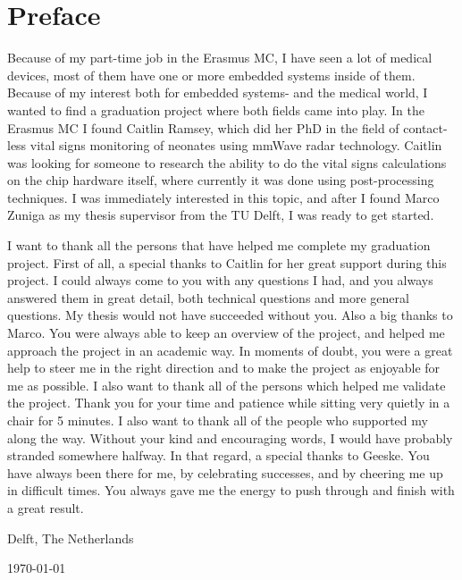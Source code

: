 \chapter*{Preface}

Because of my part-time job in the Erasmus MC, I have seen a lot of medical devices, most of them have one or more embedded systems inside of them. Because of my interest both for embedded systems- and the medical world, I wanted to find a graduation project where both fields came into play. In the Erasmus MC I found Caitlin Ramsey, which did her PhD in the field of contact-less vital signs monitoring of neonates using mmWave radar technology. Caitlin was looking for someone to research the ability to do the vital signs calculations on the chip hardware itself, where currently it was done using post-processing techniques. I was immediately interested in this topic, and after I found Marco Zuniga as my thesis supervisor from the TU Delft, I was ready to get started.

\vspace{1\baselineskip}

I want to thank all the persons that have helped me complete my graduation project. First of all, a special thanks to Caitlin for her great support during this project. I could always come to you with any questions I had, and you always answered them in great detail, both technical questions and more general questions. My thesis would not have succeeded without you. Also a big thanks to Marco. You were always able to keep an overview of the project, and helped me approach the project in an academic way. In moments of doubt, you were a great help to steer me in the right direction and to make the project as enjoyable for me as possible. I also want to thank all of the persons which helped me validate the project. Thank you for your time and patience while sitting very quietly in a chair for 5 minutes. I also want to thank all of the people who supported my along the way. Without your kind and encouraging words, I would have probably stranded somewhere halfway. In that regard, a special thanks to Geeske. You have always been there for me, by celebrating successes, and by cheering me up in difficult times. You always gave me the energy to push through and finish with a great result. 

\vspace{1\baselineskip}

\reportAuthor

\vspace{1\baselineskip}

\noindent
Delft, The Netherlands

\noindent
\today